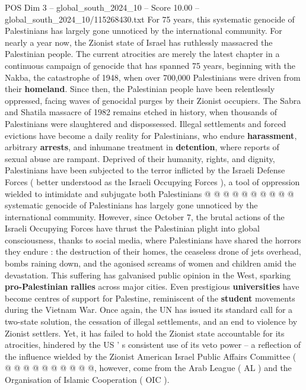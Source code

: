 \begin{textsample}{POS Dim 3 – global\_south\_2024\_10 – Score 10.00 – global\_south\_2024\_10/115268430.txt}  \label{ex:f3_pos_363}
For 75 years, this systematic genocide of Palestinians has largely gone unnoticed by the international community.
For nearly a year now, the Zionist state of Israel has ruthlessly massacred the Palestinian people.
The current atrocities are merely the latest chapter in a continuous campaign of genocide that has spanned 75 years, beginning with the Nakba, the catastrophe of 1948, when over 700,000 Palestinians were driven from their \textbf{homeland}.
Since then, the Palestinian people have been relentlessly oppressed, facing waves of genocidal purges by their Zionist occupiers.
The Sabra and Shatila massacre of 1982 remains etched in history, when thousands of Palestinians were slaughtered and dispossessed.
Illegal settlements and forced evictions have become a daily reality for Palestinians, who endure \textbf{harassment}, arbitrary \textbf{arrests}, and inhumane treatment in \textbf{detention}, where reports of sexual abuse are rampant.
Deprived of their humanity, rights, and dignity, Palestinians have been subjected to the terror inflicted by the Israeli Defense Forces ( better understood as the Israeli Occupying Forces ), a tool of oppression wielded to intimidate and subjugate both Palestinians @ @ @ @ @ @ @ @ @ @ systematic genocide of Palestinians has largely gone unnoticed by the international community.
However, since October 7, the brutal actions of the Israeli Occupying Forces have thrust the Palestinian plight into global consciousness, thanks to social media, where Palestinians have shared the horrors they endure : the destruction of their homes, the ceaseless drone of jets overhead, bombs raining down, and the agonised screams of women and children amid the devastation.
This suffering has galvanised public opinion in the West, sparking \textbf{pro-Palestinian} \textbf{rallies} across major cities.
Even prestigious \textbf{universities} have become centres of support for Palestine, reminiscent of the \textbf{student} movements during the Vietnam War.
Once again, the UN has issued its standard call for a two-state solution, the cessation of illegal settlements, and an end to violence by Zionist settlers.
Yet, it has failed to hold the Zionist state accountable for its atrocities, hindered by the US ' s consistent use of its veto power -- a reflection of the influence wielded by the Zionist American Israel Public Affairs Committee ( @ @ @ @ @ @ @ @ @ @, however, come from the Arab League ( AL ) and the Organisation of Islamic Cooperation ( OIC ).

\end{textsample}
